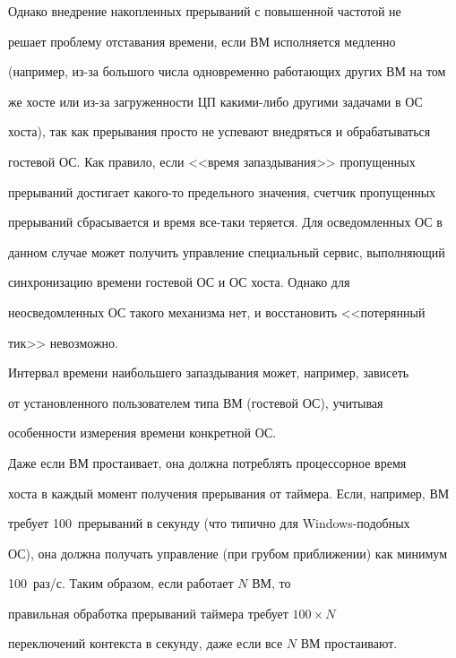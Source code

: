      


     Однако внедрение накопленных прерываний с повышенной частотой не 


решает проблему отставания времени, если ВМ исполняется медленно 


(например, из-за большого числа одновременно работающих других ВМ на том 


же хосте или из-за загруженности ЦП какими-либо другими задачами в ОС 


хоста), так как прерывания просто не успевают внедряться и обрабатываться 


гостевой ОС. Как правило, если  <<время запаздывания>> пропущенных 


прерываний достигает какого-то предельного значения, счетчик пропущенных 


прерываний сбрасывается и время все-таки теряется. Для осведомленных ОС в 


данном случае может получить управление специальный сервис, выполняющий 


синхронизацию времени гостевой ОС и ОС хоста. Однако для 


неосведомленных ОС такого механизма нет, и восстановить <<потерянный 


тик>> невозможно.


     


     Интервал времени наибольшего запаздывания может, например, зависеть 


от установленного пользователем типа ВМ (гостевой ОС), учитывая 


особенности измерения времени конкретной ОС.


     


     Даже если ВМ простаивает, она должна потреблять процессорное время 


хоста в каждый момент получения прерывания от таймера. Если, например, ВМ 


требует 100~прерываний  в секунду (что типично для Windows-по\-доб\-ных 


ОС), она должна получать управление (при грубом приближении) как минимум 


100~раз/с. Таким образом, если работает $N$ ВМ, то 


правильная обработка прерываний таймера требует $100\times N$ 


переключений контекста в секунду, даже если все $N$ ВМ простаивают.





